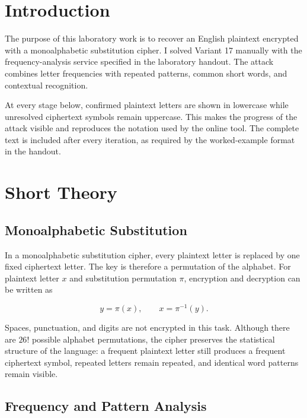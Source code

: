 \documentclass[12pt,a4paper]{article}
\begin{document}
\setcounter{page}{2}
\tableofcontents
\newpage

\section*{Introduction}

The purpose of this laboratory work is to recover an English plaintext encrypted with a monoalphabetic substitution cipher. I solved Variant 17 manually with the frequency-analysis service specified in the laboratory handout. The attack combines letter frequencies with repeated patterns, common short words, and contextual recognition.

At every stage below, confirmed plaintext letters are shown in lowercase while unresolved ciphertext symbols remain uppercase. This makes the progress of the attack visible and reproduces the notation used by the online tool. The complete text is included after every iteration, as required by the worked-example format in the handout.

\newpage
\section{Short Theory}

\subsection{Monoalphabetic Substitution}

In a monoalphabetic substitution cipher, every plaintext letter is replaced by one fixed ciphertext letter. The key is therefore a permutation of the alphabet. For plaintext letter $x$ and substitution permutation $\pi$, encryption and decryption can be written as

\begin{equation}
  y=\pi(x), \qquad x=\pi^{-1}(y).
\end{equation}

Spaces, punctuation, and digits are not encrypted in this task. Although there are $26!$ possible alphabet permutations, the cipher preserves the statistical structure of the language: a frequent plaintext letter still produces a frequent ciphertext symbol, repeated letters remain repeated, and identical word patterns remain visible.

\subsection{Frequency and Pattern Analysis}
\end{document}

